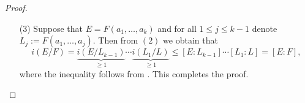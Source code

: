 \documentclass[11pt,a4paper]{article}
\begin{document}
\begin{proof}
\begin{enumerate}
    Assume that $n = [E : F] > 2$ and we have shown the proposition holds
    for $k < n$.
    Suppose that there does not exist
    a subfield $F \subsetneq L \subsetneq E$
    then $E/F$ is a simple extension and the proof is like in the base case.
    Otherwise, there exists $F \subsetneq L \subsetneq E$.
    For all $1 \le i \le r$ let
    $\varphi_i \colon F \to \Omega_i$ be an embedding of $F$ in an
    algebraically closed field $\Omega_i$.
    For all $1 \le i \le r$ we denote
    \begin{align*}
      A_i &= \set{\hat \varphi \colon L \to \Omega \mid
          \hat \varphi\vert_F = \varphi_i]} \\
      B_i &= \set{\hat \varphi \colon E \to \Omega \mid
          \hat \varphi\vert_F = \varphi_i]}
    \end{align*}
    For all $\psi \in A_i$ we denote
    \[
      C_{\psi,i} = \set{\hat \varphi \colon E \to \Omega \mid
        \hat \varphi\vert_L = \psi]}
    \]
    Then we have
    \[
      B_i = \bigsqcup_{\psi \in A_i} C_{\psi,i}
    \]
    Since $[E : F] > [E : L]$ from the induction hypothesis we know
    that $i_{\psi,\Omega_i}(E/L)$ is independent of $\psi$ and $\Omega_i$
    so we can simply write $i_{\psi,\Omega_i}(E/L) = i(E/L)$.
    Moreover, $|A_i|$ is independent of $\varphi_i$ and $\Omega_i$
    and it is simply equal to $i(L/F)$.
    Then using these observations we get
    \[
      i_{\varphi_i,\Omega_i}(E/F) =
      \sum_{\psi \in A_i} i_{\psi,\Omega_i}(E/L) =
      \sum_{\psi \in A_i} i(E/L) =
      i(E/L) \cdot i(L/F),
    \]
    which completes the proof.
  \item[(3)] Suppose that $E = F(a_1,\dots,a_k)$
    and for all $1 \le j \le k - 1$
    denote $L_j := F(a_1,\dots,a_j)$.
    Then from $(2)$ we obtain that
    \[
      i(E/F) =
      \underbrace{i(E/L_{k-1})}_{\geq 1} \cdots
      \underbrace{i(L_{1}/L)}_{\geq 1} \le
      [E : L_{k-1}] \cdots
      [L_{1} : L] = [E : F],
    \]
    where the inequality follows from .
    This completes the proof.
\end{enumerate}
\end{proof}
\end{document}
